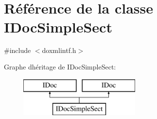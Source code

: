 \hypertarget{class_i_doc_simple_sect}{}\section{Référence de la classe I\+Doc\+Simple\+Sect}
\label{class_i_doc_simple_sect}


{\ttfamily \#include $<$doxmlintf.\+h$>$}

Graphe d\textquotesingle{}héritage de I\+Doc\+Simple\+Sect\+:\begin{figure}[H]
\begin{center}
\leavevmode
\includegraphics[height=2.000000cm]{class_i_doc_simple_sect}
\end{center}
\end{figure}
